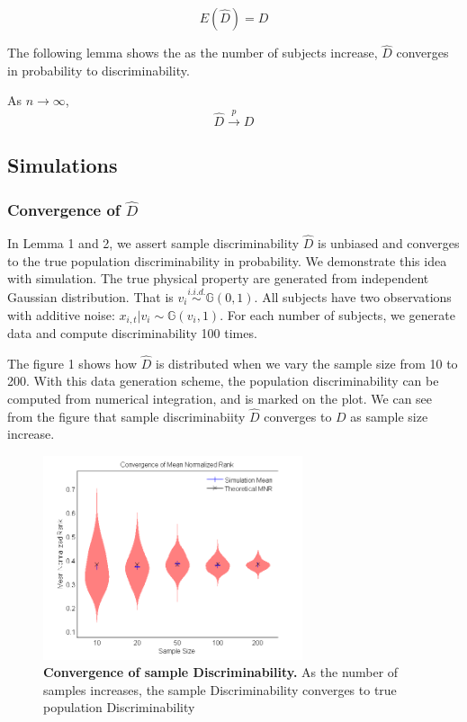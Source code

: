 \documentclass{article}
\begin{document}
\begin{lem}	
	\[ E(\hat{D}) = D\]
\end{lem}

The following lemma shows the as the number of subjects increase, $\hat{D}$ converges in probability to discriminability.
\begin{lem}	
As $n \rightarrow \infty$,
\[\hat{D} \overset{p}{\rightarrow} D \]
\end{lem}

\subsection{Simulations}

\subsubsection{Convergence of $\hat{D}$}
In Lemma 1 and 2, we assert sample discriminability $\hat{D}$ is unbiased and converges to  the true population discriminability in probability. We demonstrate this idea with simulation. The true physical property are generated from independent Gaussian distribution. That is $v_i \overset{i.i.d.}{\sim} \mathbb{G}(0,1)$. All subjects have two observations with additive noise: $x_{i,t} | v_i \sim \mathbb{G}(v_i,1)$. For each number of subjects, we generate data and compute discriminability 100 times. 

The figure 1 shows how $\hat{D}$ is distributed when we vary the sample size from 10 to 200. With this data generation scheme, the population discriminability can be computed from numerical integration, and is marked on the plot. We can see from the figure that sample discriminabiity $\hat{D}$ converges to $D$ as sample size increase.

\begin{figure}[t!]
\includegraphics[width=3.0in]{../Figs/simumnr_violin.png}
\caption{{\bf Convergence of sample Discriminability.} As the number of samples increases, the sample Discriminability  converges to true population Discriminability }
\label{fig:1}
\end{figure}
\end{document}
